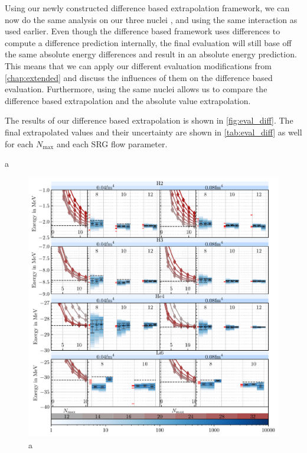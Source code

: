 Using our newly constructed difference based extrapolation framework, we can now do the same analysis on our three nuclei ,  and  using the same interaction as used earlier. Even though the difference based framework uses differences to compute a difference prediction internally, the final evaluation will still base off the same absolute energy differences and result in an absolute energy prediction. This means that we can apply our different evaluation modifications from \autoref{chap:extended} and discuss the influences of them on the difference based evaluation. Furthermore, using the same nuclei allows us to compare the difference based extrapolation and the absolute value extrapolation.

The results of our difference based extrapolation is shown in \autoref{fig:eval_diff}. The final extrapolated values and their uncertainty are shown in \autoref{tab:eval_diff} as well for each $N_\mathrm{max}$ and each SRG flow parameter.



a
\begin{figure}[H]
  \includegraphics[width=\textwidth]{media/diff_evaluation.pdf}
  \caption{a}
  \label{fig:eval_diff}
\end{figure}

